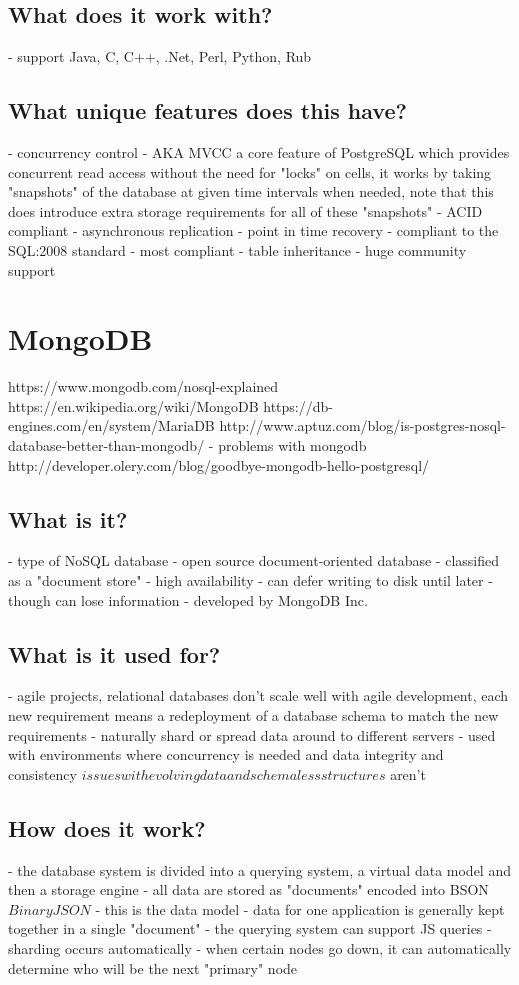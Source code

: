 \section{What does it work with?}
- support Java, C, C++, .Net, Perl, Python, Rub

\section{What unique features does this have?}
- concurrency control - AKA MVCC a core feature of PostgreSQL which provides concurrent read access without the need for "locks" on cells, it works by taking "snapshots" of the database at given time intervals when needed, note that this does introduce extra storage requirements for all of these "snapshots"
- ACID compliant
- asynchronous replication
- point in time recovery
- compliant to the SQL:2008 standard - most compliant
- table inheritance
- huge community support


\chapter{MongoDB}
https://www.mongodb.com/nosql-explained
https://en.wikipedia.org/wiki/MongoDB
https://db-engines.com/en/system/MariaDB%
http://www.aptuz.com/blog/is-postgres-nosql-database-better-than-mongodb/
- problems with mongodb
http://developer.olery.com/blog/goodbye-mongodb-hello-postgresql/

\section{What is it?}
- type of NoSQL database
- open source document-oriented database - classified as a "document store"
- high availability - can defer writing to disk until later - though can lose information
- developed by MongoDB Inc.

\section{What is it used for?}
- agile projects, relational databases don't scale well with agile development, each new requirement means a redeployment of a database schema to match the new requirements
- naturally shard or spread data around to different servers
- used with environments where concurrency is needed and data integrity and consistency \(issues with evolving data and schemaless structures\) aren't

\section{How does it work?}
- the database system is divided into a querying system, a virtual data model and then a storage engine
- all data are stored as "documents" encoded into BSON \(Binary JSON\) - this is the data model
- data for one application is generally kept together in a single "document"
- the querying system can support JS queries
- sharding occurs automatically - when certain nodes go down, it can automatically determine who will be the next "primary" node

